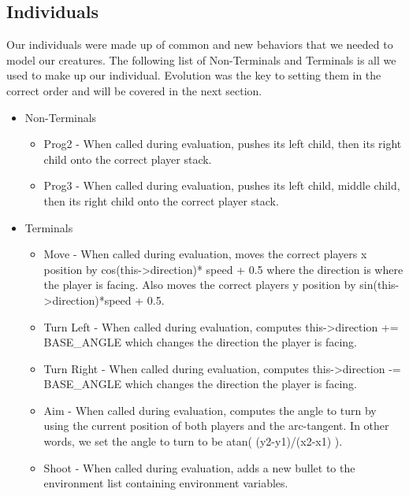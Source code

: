 \documentclass{acm_proc_article-sp}
\begin{document}
\subsection{Individuals} %
Our individuals were made up of common and new behaviors that we needed to model our creatures. The following list of Non-Terminals and Terminals is all we used to make up our individual. Evolution was the key to setting them in the correct order and will be covered in the next section.
\begin{itemize}
\item Non-Terminals
	\begin{itemize}
	\item Prog2 - When called during evaluation, pushes its left child, then its right child onto the correct player stack.
	\item Prog3 - When called during evaluation, pushes its left child, middle child, then its right child onto the correct player stack.
	\end{itemize}
\item Terminals
	\begin{itemize}
	\item Move - When called during evaluation, moves the correct players x position by cos(this->direction)* speed + 0.5 where the direction is where the player is facing. Also moves the correct players y position by sin(this->direction)*speed + 0.5.
	\item Turn Left - When called during evaluation, computes this->direction += BASE\_ANGLE which changes the direction the player is facing.
	\item Turn Right - When called during evaluation, computes this->direction -= BASE\_ANGLE which changes the direction the player is facing.
	\item Aim - When called during evaluation, computes the angle to turn by using the current position of both players and the arc-tangent. In other words, we set the angle to turn to be atan( (y2-y1)/(x2-x1) ).
	\item Shoot - When called during evaluation, adds a new bullet to the environment list containing environment variables.
	\end{itemize}
\end{itemize}
\end{document}
